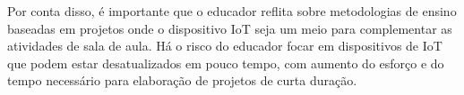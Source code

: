 \documentclass[portuguese]{textolivre}
\begin{document}
Por conta disso, é importante que o educador reflita sobre metodologias de ensino baseadas em projetos onde o dispositivo IoT seja um meio para complementar as atividades de sala de aula. Há o risco do educador focar em dispositivos de IoT que podem estar desatualizados em pouco tempo, com aumento do esforço e do tempo necessário para elaboração de projetos de curta duração.


\printbibliography\label{sec-bib}


\end{document}
